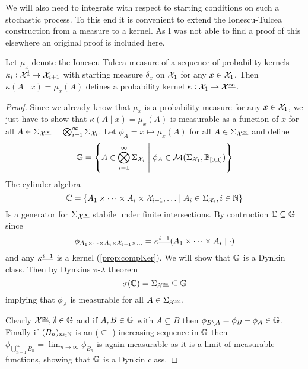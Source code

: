 We will also need to integrate with respect to starting conditions
on such a stochastic process. To this end it is convenient to
extend the Ionescu-Tulcea construction from a measure to a kernel.
As I was not able to find a proof of this elsewhere
an original proof is included here.
\begin{prop}
  Let $\mu_x$ denote the Ionescu-Tulcea measure of a
  sequence of probability kernels
  $\kappa_i : \mathcal{X}^{\underline{i}} \to \mathcal{X}_{i+1}$
  with starting measure $\delta_x$ on $\mathcal{X}_1$ for any $x \in \mathcal{X}_1$.
  Then $\kappa(A \mid x) = \mu_x(A)$ defines a probability kernel
  $\kappa : \mathcal{X}_1 \to \mathcal{X}^{\underline{\infty}}$.
\end{prop}
\begin{proof}
  Since we already know that $\mu_x$ is a probability measure for any
  $x \in \mathcal{X}_1$,
  we just have to show that $\kappa(A \mid x) = \mu_x(A)$ is measurable
  as a function of $x$ for all
  $A \in \Sigma_{\mathcal{X}^{\underline{\infty}}}
  = \bigotimes_{i=1}^\infty \Sigma_{\mathcal{X}_i}$.
  Let $\phi_A = x \mapsto \mu_x(A)$
  for all $A \in \Sigma_\mathcal{X^{\underline{\infty}}}$ and define
  \[ \mathbb{G} = \left\{ A \in \bigotimes_{i=1}^\infty \Sigma_{\mathcal{X}_i}
  \;\middle\vert\; \phi_A \in \mathcal{M}(\Sigma_{\mathcal{X}_1}, \mathbb{B}_{[0,1]}) \right\} \]
  The cylinder algebra
  \[ \mathbb{C} = \left\{ A_1 \times \dots \times A_i \times \mathcal{X}_{i+1},
  \dots \;\middle\vert\; A_i \in \Sigma_{\mathcal{X}_i}, i \in \mathbb{N} \right\} \]
  Is a generator for $\Sigma_{\mathcal{X}^{\underline{\infty}}}$ stabile under 
  finite intersections.
  By contruction $\mathbb{C} \subseteq \mathbb{G}$ since
  \[ \phi_{A_1 \times \dots \times A_i \times \mathcal{X}_{i+1} \times \dots}
  = \kappa^{\underline{i-1}}(A_1 \times \dots \times A_i \mid \cdot) \]
  and any $\kappa^{\underline{i-1}}$ is a kernel (\cref{prop:compKer}).
  We will show that $\mathbb{G}$ is a Dynkin class.
  Then by Dynkins $\pi$-$\lambda$ theorem
  \[ \sigma(\mathbb{C}) = \Sigma_{\mathcal{X}^{\underline{\infty}}}
  \subseteq \mathbb{G} \]
  implying that $\phi_A$ is measurable
  for all $A \in \Sigma_{\mathcal{X}^{\underline{\infty}}}$.
  
  Clearly $\mathcal{X}^{\underline{\infty}}, \emptyset \in \mathbb{G}$ and if
  $A,B \in \mathbb{G}$ with $A \subseteq B$ then
  $\phi_{B \setminus A} = \phi_B - \phi_A \in \mathbb{G}$.
  Finally if $(B_n)_{n \in \mathbb{N}}$ is an ($\subseteq$-) increasing sequence
  in $\mathbb{G}$ then $\phi_{\bigcup_{n=1}^\infty B_n} =
  \lim_{n \to \infty} \phi_{B_n}$ is again measurable as it is a
  limit of measurable functions, showing that $\mathbb{G}$ is a Dynkin class.
\end{proof}

